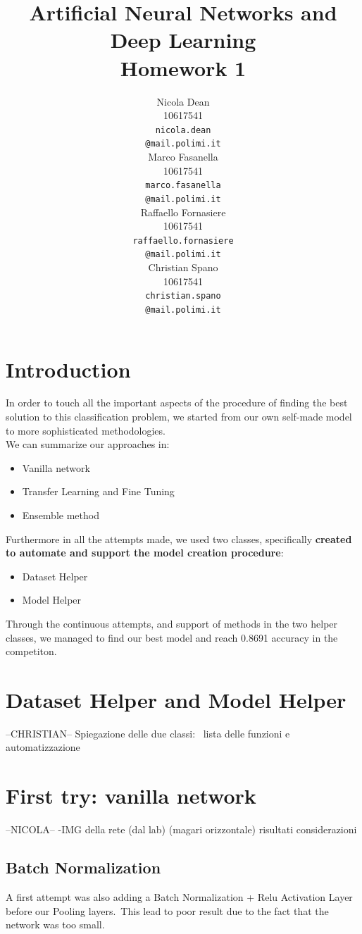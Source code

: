 \documentclass[10pt]{article}
\title{Artificial Neural Networks and Deep Learning \\
Homework 1}
\author{
  Nicola Dean \\
  10617541 \\
  {\tt nicola.dean \\
  \tt @mail.polimi.it} \\\And
  Marco Fasanella \\
  10617541 \\
  {\tt marco.fasanella \\
  \tt @mail.polimi.it} \\\And
  Raffaello Fornasiere \\
    10617541 \\
    {\tt raffaello.fornasiere \\
    \tt @mail.polimi.it} \\\And
  Christian Spano \\
  10617541 \\
  {\tt christian.spano \\
  \tt @mail.polimi.it} \\}
\date{}
\begin{document}
\maketitle



\section{Introduction}
In order to touch all the important aspects of the procedure of finding the best solution to this classification problem,
we started from our own self-made model to more sophisticated methodologies.\\
 We can summarize our approaches in:
\begin{itemize}
  \item Vanilla network
  \item Transfer Learning and Fine Tuning
  \item Ensemble method
\end{itemize}
Furthermore in all the attempts made, we used two classes, specifically \textbf{created to automate and support the model creation
procedure}:
\begin{itemize}
  \item Dataset Helper
  \item Model Helper
\end{itemize}
Through the continuous attempts, and support of methods in the two helper classes, we managed to find our best model and
reach 0.8691 accuracy in the competiton.


\section{Dataset Helper and Model Helper}
--CHRISTIAN--
Spiegazione delle due classi: \
lista delle funzioni e automatizzazione

\section{First try: vanilla network}
--NICOLA--
-IMG della rete (dal lab) (magari orizzontale)
risultati
considerazioni
\subsection{Batch Normalization}
A first attempt was also adding a Batch Normalization + Relu Activation Layer before our Pooling layers.\
This lead to poor result due to the fact that the network was too small.
\end{document}
